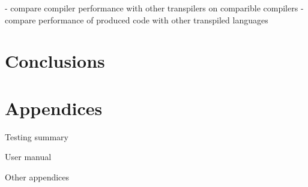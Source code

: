 \documentclass{article}
\begin{document}
- compare compiler performance with other transpilers on comparible compilers
- compare performance of produced code with other transpiled languages

\section{Conclusions}

\section{Appendices}

Testing summary

User manual
 

Other appendices
\end{document}
